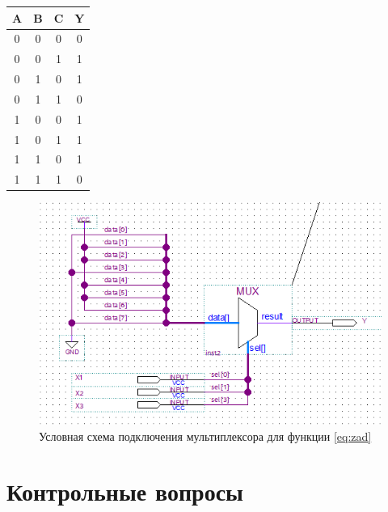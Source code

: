 \documentclass[a4paper,14pt]{article}
\begin{document}
\begin{table}[H]
	\begin{center}
		\begin{flushleft}
		\end{flushleft}
		\label{tab:zad}
		\begin{tabular}{|c|c|c|c|}
			\hline
			A & B & C & Y \\ \hline
			0 & 0 & 0 & 0 \\ \hline
			0 & 0 & 1 & 1 \\ \hline
			0 & 1 & 0 & 1 \\ \hline
			0 & 1 & 1 & 0 \\ \hline
			1 & 0 & 0 & 1 \\ \hline
			1 & 0 & 1 & 1 \\ \hline
			1 & 1 & 0 & 1 \\ \hline
			1 & 1 & 1 & 0 \\ \hline
		\end{tabular}
	\end{center}
\end{table}

\begin{figure}[H]
	\centering
	\includegraphics[width=0.6\linewidth]{img/dop3_sh}
	\caption{Условная схема подключения мультиплексора для функции \ref{eq:zad}}
	\label{fig:dop3_sh}
\end{figure}

\section{Контрольные вопросы}
\end{document}
